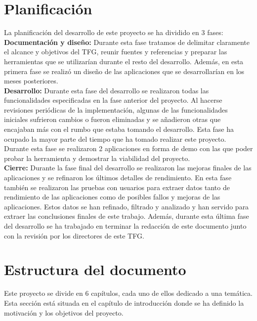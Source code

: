 \section{Planificaci\'on}

La planificaci\'on del desarrollo de este proyecto se ha dividido en 3 fases:\\


\textbf{Documentaci\'on y dise\~no:} Durante esta fase tratamos de delimitar claramente el alcance y objetivos del TFG, reunir fuentes y referencias y preparar las herramientas que se utilizar\'ian durante el resto del desarrollo. Adem\'as, en esta primera fase se realiz\'o un dise\~no de las aplicaciones que se desarrollar\'ian en los meses posteriores.\\

\textbf{Desarrollo:} Durante esta fase del desarrollo se realizaron todas las funcionalidades especificadas en la fase anterior del proyecto. Al hacerse revisiones peri\'odicas de la implementaci\'on, algunas de las funcionalidades iniciales sufrieron cambios o fueron eliminadas y se a\~nadieron otras que encajaban m\'as con el rumbo que estaba tomando el desarrollo. 
Esta fase ha ocupado la mayor parte del tiempo que ha tomado realizar este proyecto. Durante esta fase se realizaron 2 aplicaciones en forma de demo con las que poder probar la herramienta y demostrar la viabilidad del proyecto.\\

\textbf{Cierre:} Durante la fase final del desarrollo se realizaron las mejoras finales de las aplicaciones y se refinaron los \'ultimos detalles de rendimiento. En esta fase tambi\'en se realizaron las pruebas con usuarios para extraer datos tanto de rendimiento de las aplicaciones como de posibles fallos y mejoras de las aplicaciones. Estos datos se han refinado, filtrado y analizado y han servido para extraer las conclusiones finales de este trabajo. Adem\'as, durante esta \'ultima fase del desarrollo se ha trabajado en terminar la redacci\'on de este documento junto con la revisi\'on por los directores de este TFG. 

\section{Estructura del documento}

Este proyecto se divide en 6 cap\'itulos, cada uno de ellos dedicado a una tem\'atica. Esta secci\'on est\'a situada en el cap\'itulo de introducci\'on donde se ha definido la motivaci\'on y los objetivos del proyecto.\\

